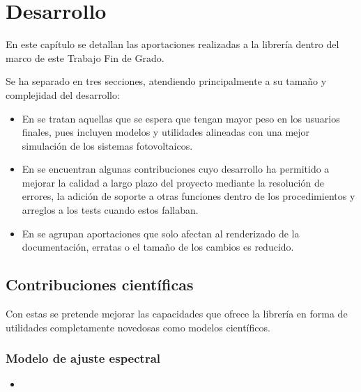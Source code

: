 \chapter{Desarrollo} \label{chp:desarrollo}

En este capítulo se detallan las aportaciones realizadas a la librería \pvlibpy{} dentro del marco de este Trabajo Fin de Grado.

Se ha separado en tres secciones, atendiendo principalmente a su tamaño y complejidad del desarrollo:

\begin{itemize}
    \item En  se tratan aquellas que se espera que tengan mayor peso en los usuarios finales, pues incluyen modelos y utilidades alineadas con una mejor simulación de los sistemas fotovoltaicos.
    \item En  se encuentran algunas contribuciones cuyo desarrollo ha permitido a mejorar la calidad a largo plazo del proyecto mediante la resolución de errores, la adición de soporte a otras funciones dentro de los procedimientos y arreglos a los tests cuando estos fallaban.
    \item En  se agrupan aportaciones que solo afectan al renderizado de la documentación, erratas o el tamaño de los cambios es reducido.
\end{itemize}

\section{Contribuciones científicas} \label{sct:desarrollo:contribuciones_cientificas}

Con estas se pretende mejorar las capacidades que ofrece la librería \pvlibpy{} en forma de utilidades completamente novedosas como modelos científicos.

\subsection{Modelo de ajuste espectral}

\begin{itemize}
    \item {}
\end{itemize}

